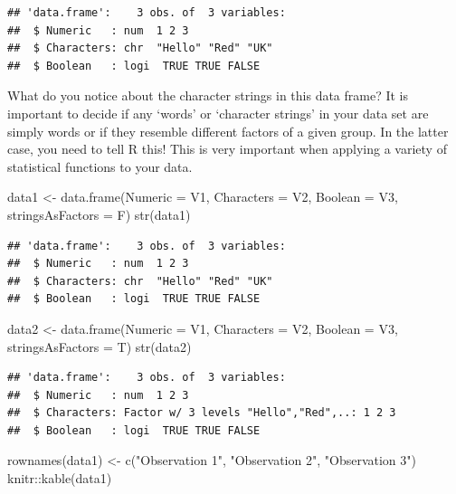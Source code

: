 \documentclass[
]{book}
\newenvironment{Shaded}{\begin{snugshade}}{\end{snugshade}}
\newcommand{\AttributeTok}[1]{\textcolor[rgb]{0.77,0.63,0.00}{#1}}
\newcommand{\FunctionTok}[1]{\textcolor[rgb]{0.00,0.00,0.00}{#1}}
\newcommand{\NormalTok}[1]{#1}
\newcommand{\OtherTok}[1]{\textcolor[rgb]{0.56,0.35,0.01}{#1}}
\newcommand{\SpecialCharTok}[1]{\textcolor[rgb]{0.00,0.00,0.00}{#1}}
\newcommand{\StringTok}[1]{\textcolor[rgb]{0.31,0.60,0.02}{#1}}
\theoremstyle{definition}
\theoremstyle{definition}
\theoremstyle{definition}
\theoremstyle{definition}
\theoremstyle{remark}
\begin{document}
\begin{verbatim}
## 'data.frame':    3 obs. of  3 variables:
##  $ Numeric   : num  1 2 3
##  $ Characters: chr  "Hello" "Red" "UK"
##  $ Boolean   : logi  TRUE TRUE FALSE
\end{verbatim}

What do you notice about the character strings in this data frame? It is important to decide if any `words' or `character strings' in your data set are simply words or if they resemble different factors of a given group. In the latter case, you need to tell R this! This is very important when applying a variety of statistical functions to your data.

\begin{Shaded}
\begin{Highlighting}[]
\NormalTok{data1 }\OtherTok{\textless{}{-}} \FunctionTok{data.frame}\NormalTok{(}\AttributeTok{Numeric =}\NormalTok{ V1, }\AttributeTok{Characters =}\NormalTok{ V2, }\AttributeTok{Boolean =}\NormalTok{ V3, }\AttributeTok{stringsAsFactors =}\NormalTok{ F)}
\FunctionTok{str}\NormalTok{(data1)}
\end{Highlighting}
\end{Shaded}

\begin{verbatim}
## 'data.frame':    3 obs. of  3 variables:
##  $ Numeric   : num  1 2 3
##  $ Characters: chr  "Hello" "Red" "UK"
##  $ Boolean   : logi  TRUE TRUE FALSE
\end{verbatim}

\begin{Shaded}
\begin{Highlighting}[]
\NormalTok{data2 }\OtherTok{\textless{}{-}} \FunctionTok{data.frame}\NormalTok{(}\AttributeTok{Numeric =}\NormalTok{ V1, }\AttributeTok{Characters =}\NormalTok{ V2, }\AttributeTok{Boolean =}\NormalTok{ V3, }\AttributeTok{stringsAsFactors =}\NormalTok{ T)}
\FunctionTok{str}\NormalTok{(data2)}
\end{Highlighting}
\end{Shaded}

\begin{verbatim}
## 'data.frame':    3 obs. of  3 variables:
##  $ Numeric   : num  1 2 3
##  $ Characters: Factor w/ 3 levels "Hello","Red",..: 1 2 3
##  $ Boolean   : logi  TRUE TRUE FALSE
\end{verbatim}

\begin{Shaded}
\begin{Highlighting}[]
\FunctionTok{rownames}\NormalTok{(data1) }\OtherTok{\textless{}{-}} \FunctionTok{c}\NormalTok{(}\StringTok{"Observation 1"}\NormalTok{, }\StringTok{"Observation 2"}\NormalTok{, }\StringTok{"Observation 3"}\NormalTok{)}
\NormalTok{knitr}\SpecialCharTok{::}\FunctionTok{kable}\NormalTok{(data1)}
\end{Highlighting}
\end{Shaded}
\end{document}
